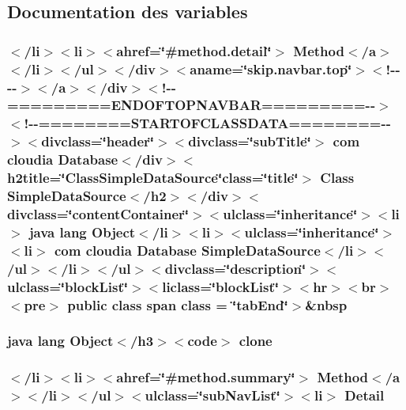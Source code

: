 \subsection{Documentation des variables}
\hypertarget{_simple_data_source_8html_a40da85afde008313f26e4cef3cbede1f}{
\subsubsection[{class}]{\setlength{\rightskip}{0pt plus 5cm}$<$/li$>$$<$li$>$$<$ahref=\char`\"{}\#method.\-detail\char`\"{}$>$ Method$<$/{\bf a}$>$$<$/li$>$$<$/ul$>$$<$/div$>$$<$aname=\char`\"{}skip.\-navbar.\-top\char`\"{}$>$$<$!-\/-\/-\/-\/$>$$<$/a$>$$<$/div$>$$<$!-\/-\/=========E\-N\-D\-O\-F\-T\-O\-P\-N\-A\-V\-B\-A\-R=========-\/-\/$>$$<$!-\/-\/========S\-T\-A\-R\-T\-O\-F\-C\-L\-A\-S\-S\-D\-A\-T\-A========-\/-\/$>$$<$divclass=\char`\"{}header\char`\"{}$>$$<$divclass=\char`\"{}sub\-Title\char`\"{}$>$ com cloudia Database$<$/div$>$$<$h2title=\char`\"{}Class\-Simple\-Data\-Source\char`\"{}class=\char`\"{}title\char`\"{}$>$ Class {\bf Simple\-Data\-Source}$<$/h2$>$$<$/div$>$$<$divclass=\char`\"{}content\-Container\char`\"{}$>$$<$ulclass=\char`\"{}inheritance\char`\"{}$>$$<$li$>$ java lang Object$<$/li$>$$<$li$>$$<$ulclass=\char`\"{}inheritance\char`\"{}$>$$<$li$>$ com cloudia Database {\bf Simple\-Data\-Source}$<$/li$>$$<$/ul$>$$<$/li$>$$<$/ul$>$$<$divclass=\char`\"{}description\char`\"{}$>$$<$ulclass=\char`\"{}block\-List\char`\"{}$>$$<$liclass=\char`\"{}block\-List\char`\"{}$>$$<$hr$>$$<$br$>$$<$pre$>$ public class {\bf span} class = \char`\"{}tab\-End\char`\"{}$>$\&nbsp}}\label{_simple_data_source_8html_a40da85afde008313f26e4cef3cbede1f}
\hypertarget{_simple_data_source_8html_adc9607fcabf6f2d7f401ad52015ef6e0}{
\subsubsection[{clone}]{\setlength{\rightskip}{0pt plus 5cm}java lang Object$<$/h3$>$$<$code$>$ clone}}\label{_simple_data_source_8html_adc9607fcabf6f2d7f401ad52015ef6e0}
\hypertarget{_simple_data_source_8html_a1e04b5ec07bcd5281e26dcd40e5b3a94}{
\subsubsection[{Detail}]{\setlength{\rightskip}{0pt plus 5cm}$<$/li$>$$<$li$>$$<$ahref=\char`\"{}\#method.\-summary\char`\"{}$>$ Method$<$/{\bf a}$>$$<$/li$>$$<$/ul$>$$<$ulclass=\char`\"{}sub\-Nav\-List\char`\"{}$>$$<$li$>$ Detail}}\label{_simple_data_source_8html_a1e04b5ec07bcd5281e26dcd40e5b3a94}
